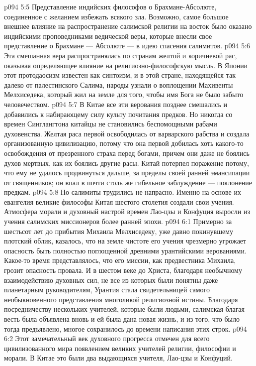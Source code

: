 \vs p094 5:5 \pc {}\bibnobreakspace Представление индийских философов о Брахмане\hyp{}Абсолюте, соединенное с желанием избежать всякого зла. Возможно, самое большое внешнее влияние на распространение салимской религии на восток было оказано индийскими проповедниками ведической веры, которые внесли свое представление о Брахмане --- Абсолюте --- в идею спасения салимитов.
\vs p094 5:6 \pc Эта смешанная вера распространялась по странам желтой и коричневой рас, оказывая определяющее влияние на религиозно\hyp{}философскую мысль. В Японии этот протодаосизм известен как синтоизм, и в этой стране, находящейся так далеко от палестинского Салима, народы узнали о воплощении Махивенты Мелхиседека, который жил на земле для того, чтобы имя Бога не было забыто человечеством.
\vs p094 5:7 В Китае все эти верования позднее смешались и добавились к набирающему силу культу почитания предков. Но никогда со времен Синглангтона китайцы не становились беспомощными рабами духовенства. Желтая раса первой освободилась от варварского рабства и создала организованную цивилизацию, потому что она первой добилась хоть какого\hyp{}то освобождения от презренного страха перед богами, причем они даже не боялись духов мертвых, как их боялись другие расы. Китай потерпел поражение потому, что ему не удалось продвинуться дальше, за пределы своей ранней эмансипации от священников; он впал в почти столь же гибельное заблуждение --- поклонение предкам.
\vs p094 5:8 \pc Но салимиты трудились не напрасно. Именно на основе их евангелия великие философы Китая шестого столетия создали свои учения. Атмосфера морали и духовный настрой времен Лао\hyp{}цзы и Конфуция выросли из учения салимских миссионеров более ранней эпохи.
\vs p094 6:1 Примерно за шестьсот лет до прибытия Михаила Мелхиседеку, уже давно покинувшему плотский облик, казалось, что на земле чистоте его учения чрезмерно угрожает опасность быть полностью поглощенной древними урантийскими верованиями. Какое\hyp{}то время представлялось, что его миссии, как предвестника Михаила, грозит опасность провала. И в шестом веке до Христа, благодаря необычному взаимодействию духовных сил, не все из которых были понятны даже планетарным руководителям, Урантия стала свидетельницей самого необыкновенного представления многоликой религиозной истины. Благодаря посредничеству нескольких учителей, которые были людьми, салимская благая весть была объявлена вновь и ей была дана новая жизнь, и из того, что было тогда предъявлено, многое сохранилось до времени написания этих строк.
\vs p094 6:2 Этот замечательный век духовного прогресса отмечен для всего цивилизованного мира появлением великих учителей религии, философии и морали. В Китае это были два выдающихся учителя, Лао\hyp{}цзы и Конфуций.
